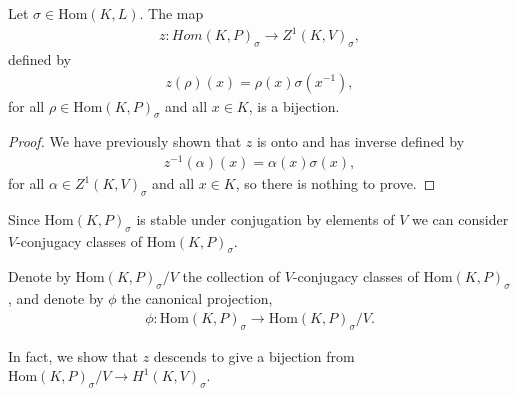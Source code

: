 \begin{lemma}
  Let $\sigma \in \mathrm{Hom}(K, L)$. The map
\begin{align*} z: Hom(K, P)_{\sigma} \rightarrow Z^1(K, V)_\sigma, \end{align*}
defined by
\begin{align*} z(\rho)(x) = \rho(x)\sigma(x^{-1}), \end{align*}
for all $\rho \in \mathrm{Hom}(K, P)_\sigma$ and all $x \in K$, is a bijection.
\label{lem:hom_z1}
\end{lemma}
\begin{proof}
We have previously shown that $z$ is onto and has inverse defined by
\begin{align*} z^{-1}(\alpha)(x) = \alpha(x)\sigma(x), \end{align*}
for all $\alpha \in Z^1(K, V)_\sigma$ and all $x \in K$, so there is nothing to prove.
\end{proof}


Since $\mathrm{Hom}(K, P)_\sigma$ is stable under conjugation by elements of $V$ we can consider $V$-conjugacy classes of $\mathrm{Hom}(K, P)_\sigma$.
\begin{definition} Denote by $\mathrm{Hom}(K, P)_\sigma / V$ the collection of $V$-conjugacy classes of $\mathrm{Hom}(K, P)_\sigma$, and denote by $\phi$ the canonical projection,
\begin{align*} \phi : \mathrm{Hom}(K, P)_\sigma \rightarrow \mathrm{Hom}(K, P)_\sigma / V. \end{align*}
\end{definition}

In fact, we show that $z$ descends to give a bijection from $\mathrm{Hom}(K, P)_\sigma / V \rightarrow H^1(K, V)_\sigma$.

